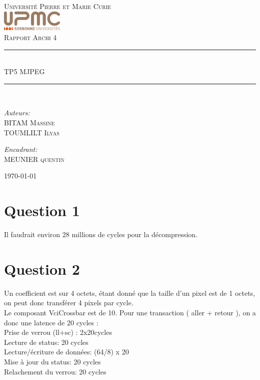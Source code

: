 \documentclass[12pt]{article}
\newcommand{\HRule}{\rule{\linewidth}{0.5mm}}
\begin{document}
\begin{titlepage}
  \begin{center}
    \textsc{\LARGE Université Pierre et Marie Curie}\\[1.5cm]
    \includegraphics[height=1cm]{upmc.png}\\[1.5cm]
    \textsc{\Large Rapport Archi 4 }\\[2cm]
    \HRule \\[1cm]
    \textsc{\huge TP5 MJPEG }\\[0.5cm]
    \HRule \\[1cm]
    \noindent
    \begin{minipage}[t]{0.55\textwidth}
      \begin{flushleft} \large
        \emph{Auteurs:}\\
        BITAM \textsc{Massine}\\
        TOUMLILT \textsc{Ilyas}
      \end{flushleft}
    \end{minipage}%
    \begin{minipage}[t]{0.47\textwidth}
      \begin{flushright} \large
        \emph{Encadrant:} \\
        MEUNIER \textsc{quentin}
      \end{flushright}
    \end{minipage}
    \vfill
    {\large \today}
  \end{center}
\end{titlepage}
\section*{Question 1}
Il faudrait environ 28 millions de cycles pour la décompression.
\section*{Question 2}
Un coefficient est sur 4 octets, étant donné que la taille d'un pixel est de 1 octets, on peut donc transférer 4 pixels par cycle.\\
Le composant VciCrossbar est de 10. Pour une transaction ( aller + retour ), on a donc une latence de 20 cycles :\\
Prise de verrou (ll+sc) : 2x20cycles\\
Lecture de status: 20 cycles\\
Lecture/écriture de données: (64/8) x 20\\
Mise à jour du status: 20 cycles\\
Relachement du verrou: 20 cycles\\
\end{document}

